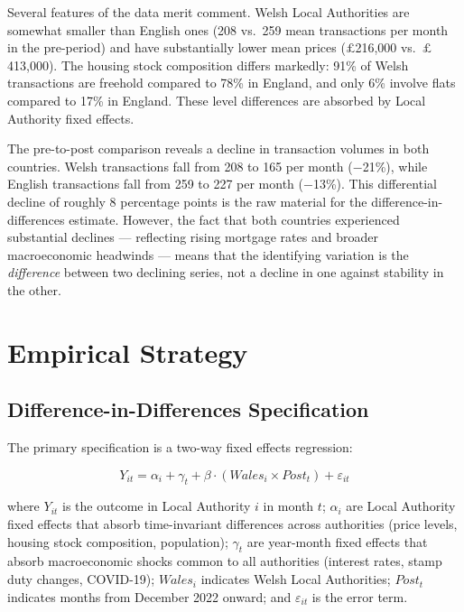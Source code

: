 \documentclass[12pt]{article}
\begin{document}
Several features of the data merit comment. Welsh Local Authorities are somewhat smaller than English ones (208 vs.\ 259 mean transactions per month in the pre-period) and have substantially lower mean prices ($\pounds$216,000 vs.\ $\pounds$413,000). The housing stock composition differs markedly: 91\% of Welsh transactions are freehold compared to 78\% in England, and only 6\% involve flats compared to 17\% in England. These level differences are absorbed by Local Authority fixed effects.

The pre-to-post comparison reveals a decline in transaction volumes in both countries. Welsh transactions fall from 208 to 165 per month ($-$21\%), while English transactions fall from 259 to 227 per month ($-$13\%). This differential decline of roughly 8 percentage points is the raw material for the difference-in-differences estimate. However, the fact that both countries experienced substantial declines --- reflecting rising mortgage rates and broader macroeconomic headwinds --- means that the identifying variation is the \textit{difference} between two declining series, not a decline in one against stability in the other.


\section{Empirical Strategy}
\label{sec:strategy}

\subsection{Difference-in-Differences Specification}

The primary specification is a two-way fixed effects regression:

\begin{equation}
\label{eq:did}
Y_{it} = \alpha_i + \gamma_t + \beta \cdot (\mathit{Wales}_i \times \mathit{Post}_t) + \varepsilon_{it}
\end{equation}

\noindent where $Y_{it}$ is the outcome in Local Authority $i$ in month $t$; $\alpha_i$ are Local Authority fixed effects that absorb time-invariant differences across authorities (price levels, housing stock composition, population); $\gamma_t$ are year-month fixed effects that absorb macroeconomic shocks common to all authorities (interest rates, stamp duty changes, COVID-19); $\mathit{Wales}_i$ indicates Welsh Local Authorities; $\mathit{Post}_t$ indicates months from December 2022 onward; and $\varepsilon_{it}$ is the error term.
\end{document}
